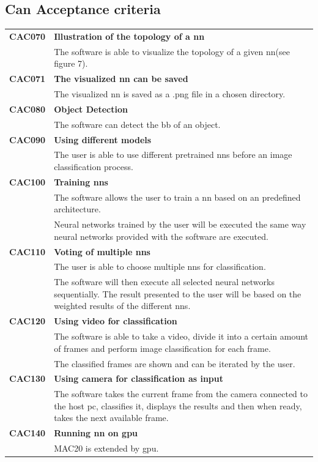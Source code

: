 \documentclass[parskip=full]{scrartcl}
\begin{document}
\subsection{Can Acceptance criteria}
\begin{tabular}{p{2cm}p{12cm}}
\textbf{CAC070} & \textbf{Illustration of the topology of a \gls{nn}} \\
& The software is able to visualize the topology of a given \gls{nn}(see figure 7). \\
\textbf{CAC071} & \textbf{The visualized nn can be saved}\\
& The visualized \gls{nn} is saved as a .png file in a chosen directory.\\
\textbf{CAC080} & \textbf{Object Detection} \\
& The software can detect the \gls{bb} of an object. \\ 
\textbf{CAC090} &  \textbf{Using different models}\\
& The user is able to use different pretrained \glspl{nn} before an \gls{image classification} process. \\
\textbf{CAC100} & \textbf{Training \glspl{nn}} \\
& The software allows the user to train a \gls{nn} based on an predefined architecture.\\
& Neural networks trained by the user will be executed the same way neural networks provided with the software are executed.\\
\textbf{CAC110} & \textbf{Voting of multiple \glspl{nn}} \\
& The user is able to choose multiple \glspl{nn} for classification.\\
& The software will then execute all selected neural networks sequentially. The result presented to the user will be based on the weighted results of the different \glspl{nn}.\\
\textbf{CAC120} & \textbf{Using video for classification} \\
& The software is able to take a video, divide it into a certain amount of frames and perform \gls{image classification} for each frame.\\
& The classified frames are shown and can be iterated by the user. \\
\textbf{CAC130} & \textbf{Using camera for classification as input} \\
& The software takes the current frame from the camera connected to the \gls{host pc}, classifies it, displays the results and then when ready, takes the next available frame.\\
\textbf{CAC140} & \textbf{Running \gls{nn} on \gls{gpu}}\\
& MAC20 is extended by \gls{gpu}.\\
\end{tabular}
\end{document}
